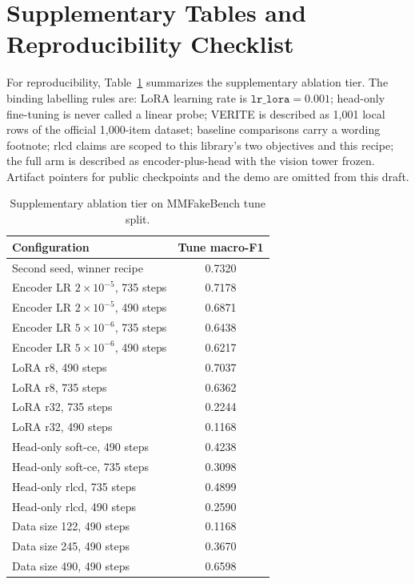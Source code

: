 \documentclass{article} %
\begin{document}
\section{Supplementary Tables and Reproducibility Checklist}
\label{app:tables}
For reproducibility, Table~\ref{tab:ablation} summarizes the supplementary ablation tier. The binding labelling rules are: LoRA learning rate is \( \texttt{lr\_lora}=0.001\); head-only fine-tuning is never called a linear probe; VERITE is described as 1,001 local rows of the official 1,000-item dataset; baseline comparisons carry a wording footnote; rlcd claims are scoped to this library's two objectives and this recipe; the full arm is described as encoder-plus-head with the vision tower frozen. Artifact pointers for public checkpoints and the demo are omitted from this draft.

\begin{table}[t]
\centering
\small
\caption{Supplementary ablation tier on MMFakeBench tune split.}
\label{tab:ablation}
\begin{tabular}{lc}
\toprule
Configuration & Tune macro-F1 \\
\midrule
Second seed, winner recipe & 0.7320 \\
Encoder LR \(2\times10^{-5}\), 735 steps & 0.7178 \\
Encoder LR \(2\times10^{-5}\), 490 steps & 0.6871 \\
Encoder LR \(5\times10^{-6}\), 735 steps & 0.6438 \\
Encoder LR \(5\times10^{-6}\), 490 steps & 0.6217 \\
LoRA r8, 490 steps & 0.7037 \\
LoRA r8, 735 steps & 0.6362 \\
LoRA r32, 735 steps & 0.2244 \\
LoRA r32, 490 steps & 0.1168 \\
Head-only soft-ce, 490 steps & 0.4238 \\
Head-only soft-ce, 735 steps & 0.3098 \\
Head-only rlcd, 735 steps & 0.4899 \\
Head-only rlcd, 490 steps & 0.2590 \\
Data size 122, 490 steps & 0.1168 \\
Data size 245, 490 steps & 0.3670 \\
Data size 490, 490 steps & 0.6598 \\
\bottomrule
\end{tabular}
\end{table}
\end{document}
